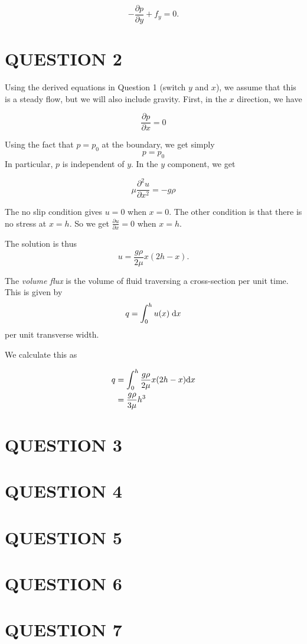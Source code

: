\documentclass[a4paper]{article}
\begin{document}
\[
-\frac{\partial p}{\partial y} + f_{y} = 0.
\]

\section{QUESTION 2}

Using the derived equations in Question 1 (switch $ y $ and $ x $), we assume that this is a steady flow, but we will also include gravity. First, in the $ x $ direction, we have

\[ \frac{\partial p }{\partial x} = 0 \]

Using the fact that $p = p_0$ at the boundary, we get simply
\[
p = p_0
\]
In particular, $p$ is independent of $y$. In the $y$ component, we get

\[
\mu \frac{\partial^2 u}{\partial x^2} = - g\rho
\]


The no slip condition gives $u = 0$ when $x = 0$. The other condition is that there is no stress at $x = h$. So we get $\frac{\partial u}{\partial x} = 0$ when $x = h$.

The solution is thus
\[
u = \frac{g\rho}{2 \mu} x(2h - x).
\]


The \emph{volume flux} is the volume of fluid traversing a cross-section per unit time. This is given by
\[
q = \int_0^h u(x) \;\mathrm{d} x
\]
per unit transverse width.

We calculate this as 

\begin{align*}
q & = \int_{0}^{h} \frac{g\rho}{2 \mu} x(2h - x) \mathrm{d} x \\
& = \frac{g\rho}{3 \mu} h^{3}
\end{align*}


\section{QUESTION 3}
\section{QUESTION 4}
\section{QUESTION 5}
\section{QUESTION 6}
\section{QUESTION 7}
\end{document}
